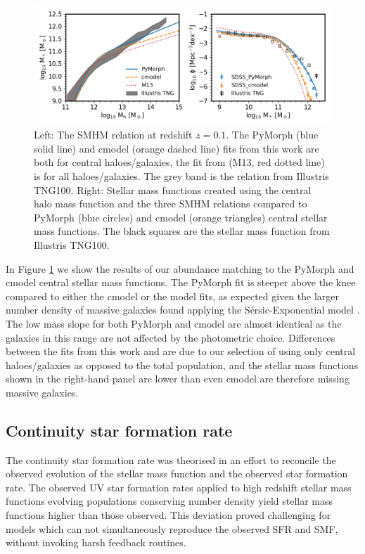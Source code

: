\begin{figure}[h]
    \centering
    \includegraphics[width = \linewidth]{Figures/Chapter2/AbundaceMtch_Data.png}
    \caption{Left: The SMHM relation at redshift $z=0.1$. The PyMorph (blue solid line) and cmodel (orange dashed line) fits from this work are both for central haloes/galaxies, the fit from \citet{Moster2013} (M13, red dotted line) is for all haloes/galaxies. The grey band is the relation from Illustris TNG100. Right: Stellar mass functions created using the central halo mass function and the three SMHM relations compared to PyMorph (blue circles) and cmodel (orange triangles) central stellar mass functions. The black squares are the stellar mass function from Illustris TNG100.}
    \label{fig:Abn_Data}
\end{figure}

In Figure \ref{fig:Abn_Data} we show the results of our abundance matching to the PyMorph and cmodel central stellar mass functions. The PyMorph fit is steeper above the knee compared to either the cmodel or the \citet{Moster2013} model fits, as expected given the larger number density of massive galaxies found applying the S\'ersic-Exponential model \citep[eg.,][]{Shankar2014, Kravtsov2018StellarHalos}. The low mass slope for both PyMorph and cmodel are almost identical as the galaxies in this range are not affected by the photometric choice. Differences between the fits from this work and \citet{Moster2013} are due to our selection of using only central haloes/galaxies as opposed to the total population, and the stellar mass functions shown in the right-hand panel are lower than even cmodel are therefore missing massive galaxies.


\subsection{Continuity star formation rate}

The continuity star formation rate was theorised in an effort to reconcile the observed evolution of the stellar mass function and the observed star formation rate. The observed UV star formation rates applied to high redshift stellar mass functions evolving populations conserving number density yield stellar mass functions higher than those observed. This deviation proved challenging for models which can not simultaneously reproduce the observed SFR and SMF, without invoking harsh feedback routines.

